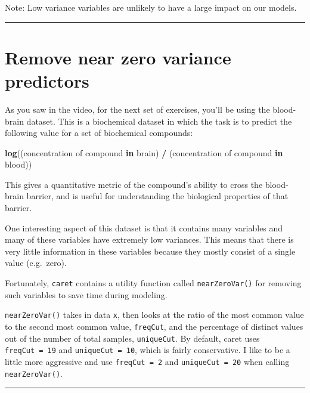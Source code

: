 \documentclass[]{book}
\newenvironment{Shaded}{\begin{snugshade}}{\end{snugshade}}
\newcommand{\KeywordTok}[1]{\textcolor[rgb]{0.13,0.29,0.53}{\textbf{#1}}}
\newcommand{\StringTok}[1]{\textcolor[rgb]{0.31,0.60,0.02}{#1}}
\newcommand{\ControlFlowTok}[1]{\textcolor[rgb]{0.13,0.29,0.53}{\textbf{#1}}}
\newcommand{\OperatorTok}[1]{\textcolor[rgb]{0.81,0.36,0.00}{\textbf{#1}}}
\newcommand{\NormalTok}[1]{#1}
\begin{document}
Note: Low variance variables are unlikely to have a large impact on our
models.

\begin{center}\rule{0.5\linewidth}{\linethickness}\end{center}

\section{Remove near zero variance
predictors}\label{remove-near-zero-variance-predictors}

As you saw in the video, for the next set of exercises, you'll be using
the blood-brain dataset. This is a biochemical dataset in which the task
is to predict the following value for a set of biochemical compounds:

\begin{Shaded}
\begin{Highlighting}[]
\KeywordTok{log}\NormalTok{((concentration of compound }\ControlFlowTok{in}\NormalTok{ brain) }\OperatorTok{/}
\StringTok{      }\NormalTok{(concentration of compound }\ControlFlowTok{in}\NormalTok{ blood))}
\end{Highlighting}
\end{Shaded}

This gives a quantitative metric of the compound's ability to cross the
blood-brain barrier, and is useful for understanding the biological
properties of that barrier.

One interesting aspect of this dataset is that it contains many
variables and many of these variables have extremely low variances. This
means that there is very little information in these variables because
they mostly consist of a single value (e.g.~zero).

Fortunately, \texttt{caret} contains a utility function called
\texttt{nearZeroVar()} for removing such variables to save time during
modeling.

\texttt{nearZeroVar()} takes in data \texttt{x}, then looks at the ratio
of the most common value to the second most common value,
\texttt{freqCut}, and the percentage of distinct values out of the
number of total samples, \texttt{uniqueCut}. By default, caret uses
\texttt{freqCut\ =\ 19} and \texttt{uniqueCut\ =\ 10}, which is fairly
conservative. I like to be a little more aggressive and use
\texttt{freqCut\ =\ 2} and \texttt{uniqueCut\ =\ 20} when calling
\texttt{nearZeroVar()}.

\begin{center}\rule{0.5\linewidth}{\linethickness}\end{center}
\end{document}
